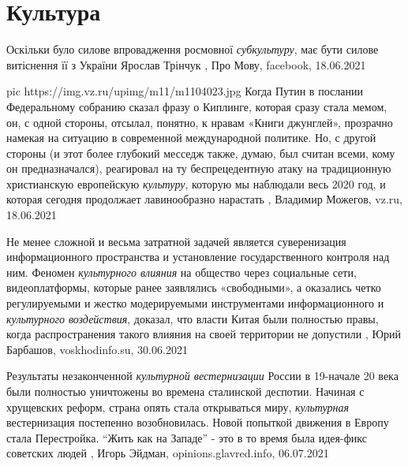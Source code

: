  
 
 
 
 
\chapter{Культура}
\label{sec:slova.kultura}

Оскільки було силове впровадження росмовної \emph{субкультуру}, має бути силове витіснення її з України
Ярослав Трінчук
, 
Про Мову, facebook, 18.06.2021

\ifcmt
  pic https://img.vz.ru/upimg/m11/m1104023.jpg
\fi
Когда Путин в послании Федеральному собранию сказал фразу о Киплинге, которая
сразу стала мемом, он, с одной стороны, отсылал, понятно, к нравам «Книги
джунглей», прозрачно намекая на ситуацию в современной международной политике.
Но, с другой стороны (и этот более глубокий месседж также, думаю, был считан
всеми, кому он предназначался), реагировал на ту беспрецедентную атаку на
традиционную христианскую европейскую \emph{культуру}, которую мы наблюдали весь 2020
год, и которая сегодня продолжает лавинообразно нарастать
, 
Владимир Можегов, vz.ru, 18.06.2021

Не менее сложной и весьма затратной задачей является суверенизация
информационного пространства и установление государственного контроля над ним.
Феномен \emph{культурного влияния} на общество через социальные сети, видеоплатформы,
которые ранее заявлялись «свободными», а оказались четко регулируемыми и жестко
модерируемыми инструментами информационного и \emph{культурного воздействия}, доказал,
что власти Китая были полностью правы, когда распространения такого влияния на
своей территории не допустили
, 
Юрий Барбашов, voskhodinfo.su, 30.06.2021

Результаты незаконченной \emph{культурной вестернизации} России в 19-начале 20 века
были полностью уничтожены во времена сталинской деспотии. Начиная с хрущевских
реформ, страна опять стала открываться миру, \emph{культурная} вестернизация
постепенно возобновилась.  Новой попыткой движения в Европу стала Перестройка.
\enquote{Жить как на Западе} - это в то время была идея-фикс советских людей
, 
Игорь Эйдман, opinions.glavred.info, 06.07.2021

